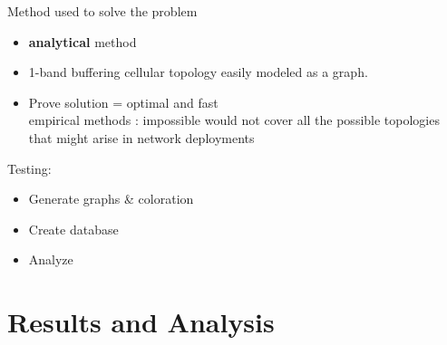\documentclass{beamer}
\begin{document}
\begin{frame}{Method used to solve the problem}

\begin{itemize}
  \item \textbf{analytical} method
  \item 1-band buffering cellular topology \textrightarrow{} easily modeled as a graph.
  \item Prove solution = optimal and fast\\
  \textrightarrow{} empirical methods : impossible 
  would not cover all the possible topologies that might arise in network deployments
\end{itemize}

\vskip 1cm

Testing:
\begin{itemize}
  \item Generate graphs \& coloration
  \item Create database
  \item Analyze
\end{itemize}

\end{frame}


\section{Results and Analysis}
\end{document}
